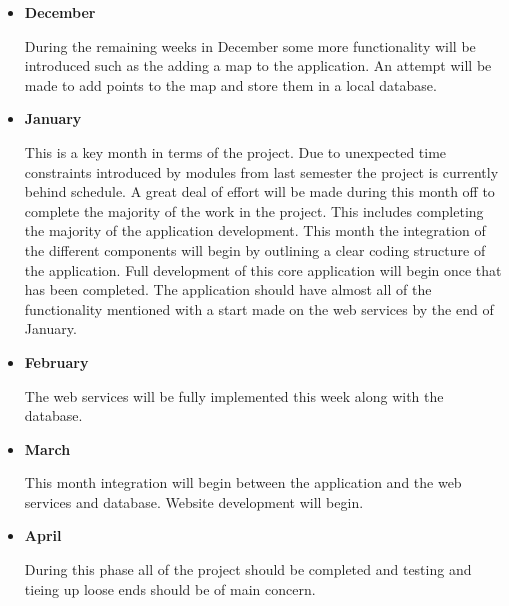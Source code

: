 \documentclass[12pt]{article}
\begin{document}
\begin{itemize}
\item \textbf {December}

During the remaining weeks in December some more functionality will be introduced such as the adding a map to the application. An attempt will be made to add points to the map and store them in a local database.

\item \textbf {January}

This is a key month in terms of the project. Due to unexpected time constraints introduced by modules from last semester the project is currently behind schedule. A great deal of effort will be made during this month off to complete the majority of the work in the project. This includes completing the majority of the application development. This month the integration of the different components will begin by outlining a clear coding structure of the application. 
Full development of this core application will begin once that has been completed. The application should have almost all of the functionality mentioned with a start made on the web services by the end of January.
\newpage
\item \textbf {February}

The web services will be fully implemented this week along with the database. 

\item \textbf {March}

This month integration will begin between the application and the web services and database. Website development will begin.

\item \textbf {April}

During this phase all of the project should be completed and testing and tieing up loose ends should be of main concern.

\end{itemize}
\end{document}
